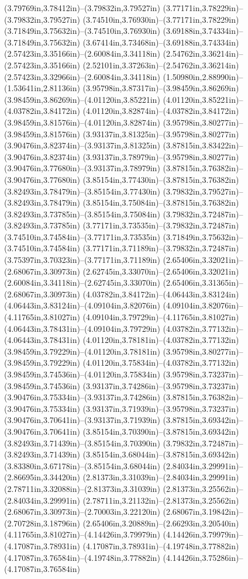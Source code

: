 (3.79769in,3.78412in)--(3.79832in,3.79527in) (3.77171in,3.78229in)--(3.79832in,3.79527in) (3.74510in,3.76930in)--(3.77171in,3.78229in) (3.71849in,3.75632in)--(3.74510in,3.76930in) (3.69188in,3.74334in)--(3.71849in,3.75632in) (3.67414in,3.73468in)--(3.69188in,3.74334in) (2.57423in,3.35166in)--(2.60084in,3.34118in) (2.54762in,3.36214in)--(2.57423in,3.35166in) (2.52101in,3.37263in)--(2.54762in,3.36214in) (2.57423in,3.32966in)--(2.60084in,3.34118in) (1.50980in,2.88990in)--(1.53641in,2.81136in) (3.95798in,3.87317in)--(3.98459in,3.86269in) (3.98459in,3.86269in)--(4.01120in,3.85221in) (4.01120in,3.85221in)--(4.03782in,3.84172in) (4.01120in,3.82874in)--(4.03782in,3.84172in) (3.98459in,3.81576in)--(4.01120in,3.82874in) (3.95798in,3.80277in)--(3.98459in,3.81576in) (3.93137in,3.81325in)--(3.95798in,3.80277in) (3.90476in,3.82374in)--(3.93137in,3.81325in) (3.87815in,3.83422in)--(3.90476in,3.82374in) (3.93137in,3.78979in)--(3.95798in,3.80277in) (3.90476in,3.77680in)--(3.93137in,3.78979in) (3.87815in,3.76382in)--(3.90476in,3.77680in) (3.85154in,3.77430in)--(3.87815in,3.76382in) (3.82493in,3.78479in)--(3.85154in,3.77430in) (3.79832in,3.79527in)--(3.82493in,3.78479in) (3.85154in,3.75084in)--(3.87815in,3.76382in) (3.82493in,3.73785in)--(3.85154in,3.75084in) (3.79832in,3.72487in)--(3.82493in,3.73785in) (3.77171in,3.73535in)--(3.79832in,3.72487in) (3.74510in,3.74584in)--(3.77171in,3.73535in) (3.71849in,3.75632in)--(3.74510in,3.74584in) (3.77171in,3.71189in)--(3.79832in,3.72487in) (3.75397in,3.70323in)--(3.77171in,3.71189in) (2.65406in,3.32021in)--(2.68067in,3.30973in) (2.62745in,3.33070in)--(2.65406in,3.32021in) (2.60084in,3.34118in)--(2.62745in,3.33070in) (2.65406in,3.31365in)--(2.68067in,3.30973in) (4.03782in,3.84172in)--(4.06443in,3.83124in) (4.06443in,3.83124in)--(4.09104in,3.82076in) (4.09104in,3.82076in)--(4.11765in,3.81027in) (4.09104in,3.79729in)--(4.11765in,3.81027in) (4.06443in,3.78431in)--(4.09104in,3.79729in) (4.03782in,3.77132in)--(4.06443in,3.78431in) (4.01120in,3.78181in)--(4.03782in,3.77132in) (3.98459in,3.79229in)--(4.01120in,3.78181in) (3.95798in,3.80277in)--(3.98459in,3.79229in) (4.01120in,3.75834in)--(4.03782in,3.77132in) (3.98459in,3.74536in)--(4.01120in,3.75834in) (3.95798in,3.73237in)--(3.98459in,3.74536in) (3.93137in,3.74286in)--(3.95798in,3.73237in) (3.90476in,3.75334in)--(3.93137in,3.74286in) (3.87815in,3.76382in)--(3.90476in,3.75334in) (3.93137in,3.71939in)--(3.95798in,3.73237in) (3.90476in,3.70641in)--(3.93137in,3.71939in) (3.87815in,3.69342in)--(3.90476in,3.70641in) (3.85154in,3.70390in)--(3.87815in,3.69342in) (3.82493in,3.71439in)--(3.85154in,3.70390in) (3.79832in,3.72487in)--(3.82493in,3.71439in) (3.85154in,3.68044in)--(3.87815in,3.69342in) (3.83380in,3.67178in)--(3.85154in,3.68044in) (2.84034in,3.29991in)--(2.86695in,3.34420in) (2.81373in,3.31039in)--(2.84034in,3.29991in) (2.78711in,3.32088in)--(2.81373in,3.31039in) (2.81373in,3.25562in)--(2.84034in,3.29991in) (2.78711in,3.21132in)--(2.81373in,3.25562in) (2.68067in,3.30973in)--(2.70003in,3.22120in) (2.68067in,3.19842in)--(2.70728in,3.18796in) (2.65406in,3.20889in)--(2.66293in,3.20540in) (4.11765in,3.81027in)--(4.14426in,3.79979in) (4.14426in,3.79979in)--(4.17087in,3.78931in) (4.17087in,3.78931in)--(4.19748in,3.77882in) (4.17087in,3.76584in)--(4.19748in,3.77882in) (4.14426in,3.75286in)--(4.17087in,3.76584in) 